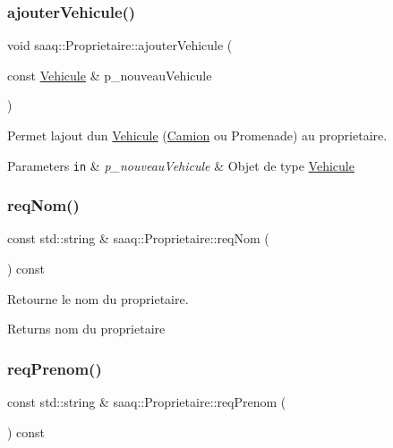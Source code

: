 \subsubsection{\texorpdfstring{ajouter\+Vehicule()}{ajouterVehicule()}}
{\footnotesize\ttfamily void saaq\+::\+Proprietaire\+::ajouter\+Vehicule (\begin{DoxyParamCaption}\item[{const \hyperlink{classsaaq_1_1Vehicule}{Vehicule} \&}]{p\+\_\+nouveau\+Vehicule }\end{DoxyParamCaption})}



Permet l\textquotesingle{}ajout d\textquotesingle{}un \hyperlink{classsaaq_1_1Vehicule}{Vehicule} (\hyperlink{classsaaq_1_1Camion}{Camion} ou Promenade) au proprietaire. 


\begin{DoxyParams}[1]{Parameters}
\mbox{\tt in}  & {\em p\+\_\+nouveau\+Vehicule} & Objet de type \hyperlink{classsaaq_1_1Vehicule}{Vehicule} \\
\hline
\end{DoxyParams}
\mbox{\label{classsaaq_1_1Proprietaire_aed34cc351d73ce99c9cccc24badc2191}} 
\subsubsection{\texorpdfstring{req\+Nom()}{reqNom()}}
{\footnotesize\ttfamily const std\+::string \& saaq\+::\+Proprietaire\+::req\+Nom (\begin{DoxyParamCaption}{ }\end{DoxyParamCaption}) const}



Retourne le nom du proprietaire. 

\begin{DoxyReturn}{Returns}
nom du proprietaire 
\end{DoxyReturn}
\mbox{\label{classsaaq_1_1Proprietaire_a12480a6a2c063c3447df4e334960d7c6}} 
\subsubsection{\texorpdfstring{req\+Prenom()}{reqPrenom()}}
{\footnotesize\ttfamily const std\+::string \& saaq\+::\+Proprietaire\+::req\+Prenom (\begin{DoxyParamCaption}{ }\end{DoxyParamCaption}) const}



